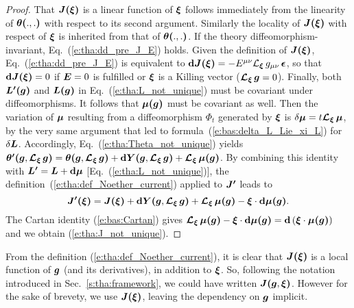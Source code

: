 \begin{proof}
That $\bm{J}\textbf{(}\bm{\xi}\textbf{)}$ is a linear function of $\bm{\xi}$ follows immediately from
the linearity of $\bm{\theta}\textbf{(} .,.\textbf{)}$ with respect to its second argument. Similarly the
locality of $\bm{J}\textbf{(}\bm{\xi}\textbf{)}$ with respect of $\bm{\xi}$ is inherited from
that of $\bm{\theta}\textbf{(} .,.\textbf{)}$.
If the theory diffeomorphism-invariant, Eq.~(\ref{e:tha:dd_pre_J_E}) holds. Given the
definition of $\bm{J}\textbf{(}\bm{\xi}\textbf{)}$, Eq.~(\ref{e:tha:dd_pre_J_E}) is equivalent to
$\mathbf{d}\bm{J}\textbf{(}\bm{\xi}\textbf{)}  = - E^{\mu\nu} {\mathcal{L}}_{\bm{\xi}}\, g_{\mu\nu} \,\bm{\epsilon}$,
so that $\mathbf{d}\bm{J}\textbf{(}\bm{\xi}\textbf{)}  = 0$ if $\bm{E} = 0$ is fulfilled or $\bm{\xi}$ is a Killing vector ($\bm{\mathcal{L}}_{\bm{\xi}}\,\bm{g} = 0$). Finally,
both $\bm{L'}\textbf{(}\bm{g}\textbf{)}$ and $\bm{L}\textbf{(}\bm{g}\textbf{)}$
in Eq.~(\ref{e:tha:L_not_unique})
must be covariant under diffeomorphisms. It follows that
$\bm{\mu}\textbf{(}\bm{g}\textbf{)}$ must be covariant as well. Then the variation of $\bm{\mu}$
resulting from a diffeomorphism $\Phi_t$ generated by $\bm{\xi}$ is
$\delta\bm{\mu} = t \bm{\mathcal{L}}_{\bm{\xi}}\,\bm{\mu}$, by the very same argument that led to
formula~(\ref{e:bas:delta_L_Lie_xi_L}) for $\delta\bm{L}$. Accordingly,
Eq.~(\ref{e:tha:Theta_not_unique}) yields
$\bm{\theta'}\textbf{(}\bm{g},\bm{\mathcal{L}}_{\bm{\xi}}\,\bm{g}\textbf{)} = \bm{\theta}\textbf{(}\bm{g},\bm{\mathcal{L}}_{\bm{\xi}}\,\bm{g}\textbf{)} +
\mathbf{d} \bm{Y}\textbf{(}\bm{g},\bm{\mathcal{L}}_{\bm{\xi}}\,\bm{g}\textbf{)} +  \bm{\mathcal{L}}_{\bm{\xi}}\,\bm{\mu}\textbf{(}\bm{g}\textbf{)}$.
By combining this identity with $\bm{L'} = \bm{L} + \mathbf{d}\bm{\mu}$ [Eq.~(\ref{e:tha:L_not_unique})],
the definition~(\ref{e:tha:def_Noether_current}) applied to $\bm{J'}$ leads to
\[
    \bm{J'}\textbf{(}\bm{\xi}\textbf{)} =  \bm{J}\textbf{(}\bm{\xi}\textbf{)}  + \mathbf{d} \bm{Y}\textbf{(}\bm{g},\bm{\mathcal{L}}_{\bm{\xi}}\,\bm{g}\textbf{)}
     + \bm{\mathcal{L}}_{\bm{\xi}}\,\bm{\mu}\textbf{(}\bm{g}\textbf{)}
     - \bm{\xi}\cdot\mathbf{d}\bm{\mu}\textbf{(}\bm{g}\textbf{)} .
\]
The Cartan identity (\ref{e:bas:Cartan}) gives
$\bm{\mathcal{L}}_{\bm{\xi}}\,\bm{\mu}\textbf{(}\bm{g}\textbf{)} - \bm{\xi}\cdot\mathbf{d}\bm{\mu}\textbf{(}\bm{g}\textbf{)}  = \mathbf{d}\left( \bm{\xi}\cdot\bm{\mu}\textbf{(}\bm{g}\textbf{)} \right)$
and we obtain (\ref{e:tha:J_not_unique}).
\end{proof}

\begin{remark}
\label{r:tha:notation_J}
From the definition (\ref{e:tha:def_Noether_current}), it is clear that
$\bm{J}\textbf{(}\bm{\xi}\textbf{)}$ is a local function of $\bm{g}$ (and its derivatives), in addition to $\bm{\xi}$. So, following the notation introduced in Sec.~\ref{s:tha:framework}, we could have written
$\bm{J}\textbf{(}\bm{g},\bm{\xi}\textbf{)}$. However for the sake of brevety, we use
$\bm{J}\textbf{(}\bm{\xi}\textbf{)}$, leaving the dependency on $\bm{g}$ implicit.
\end{remark}

